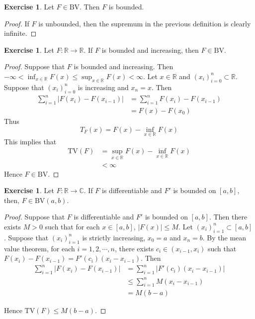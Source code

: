 \documentclass{book}
\theoremstyle{definition}
\newtheorem{ex}[definition]{Exercise}
\newcommand{\C}{\mathbb{C}}
\newcommand{\R}{\mathbb{R}}
\newcommand{\lex}[1]{\label{ex:#1}}
\DeclareMathOperator*{\0}{\mbf{0}}
\DeclareMathOperator*{\1}{\mbf{1}}
\newcommand{\BV}{\text{BV}}
\newcommand{\TV}{\text{TV}}
\begin{document}
	\begin{ex} \lex{00000} 
		Let $F \in \BV$. Then $F$ is bounded.
	\end{ex}
	
	\begin{proof}
		If $F$ is unbounded, then the supremum in the previous definition is clearly infinite.
	\end{proof}
	
	\begin{ex} \lex{00000} 
		Let $F:\R \rightarrow \R$. If $F$ is bounded and increasing, then $F \in \BV$.
	\end{ex}
	
	\begin{proof}
		Suppose that $F$ is bounded and increasing. Then $-\infty<\inf_{x \in \R}F(x) \leq \sup_{x \in \R}F(x)<\infty$. Let $x \in \R$ and $(x_i)_{i=0}^n \subset \R$. Suppose that $(x_i)_{i=0}^n$ is increasing and $x_n=x$. Then 
		\begin{align*}
			\sum_{i=1}^n|F(x_i)-F(x_{i-1})| 
			&= \sum_{i=1}^n F(x_i)-F(x_{i-1})\\
			&= F(x)-F(x_0)
		\end{align*}
		Thus 
		$$T_F(x) = F(x)-\inf_{x \in \R}F(x)$$ 
		This implies that 
		\begin{align*}
			\TV(F) 
			&= \sup_{x \in \R}F(x)-\inf_{x \in \R}F(x)\\
			&<\infty
		\end{align*}
		Hence $F \in \BV$.
	\end{proof}
	
	\begin{ex} \lex{00000} 
		Let $F:\R \rightarrow \C$. If $F$ is differentiable and $F'$ is bounded on $[a,b]$, then, $F \in \BV(a,b)$. 
	\end{ex}
	
	\begin{proof}
		Suppose that $F$ is differentiable and $F'$ is bounded on $[a,b]$. Then there exists $M>0$ such that for each $x \in [a,b]$, $|F(x)| \leq M$. Let $(x_i)_{i=1}^n \subset [a,b]$. Suppose that $(x_i)_{i=1}^n$ is strictly increasing, $x_0=a$ and $x_n=b$. By the mean value theorem, for each $i =1,2, \cdots, n$, there exists $c_i\in (x_{i-1}, x_i)$ such that $F(x_i)-F(x_{i-1})=F'(c_i)(x_i-x_{i-1})$. Then 
		\begin{align*}
			\sum_{i=1}^n|F(x_i)-F(x_{i-1})|
			&= \sum_{i=1}^n|F'(c_i)(x_i-x_{i-1})|\\
			&\leq  \sum_{i=1}^nM(x_i-x_{i-1})\\
			&=M(b-a)
		\end{align*}
		
		Hence $\TV(F) \leq M(b-a)$.
	\end{proof}
	
\end{document}
